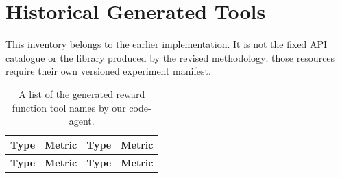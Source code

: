 \section{Historical Generated Tools} \label{apd:generated_tools}

This inventory belongs to the earlier implementation. It is not the fixed API catalogue or the library produced by the revised methodology; those resources require their own versioned experiment manifest.




% 



{\footnotesize\setlength{\tabcolsep}{3pt}%
\begin{longtable}{|l|l|l|l|}
\caption{A list of the generated reward function tool names by our code-agent.} \label{tab:tool_name_list} \\ \hline 
\textbf{Type} & \textbf{Metric} & \textbf{Type} & \textbf{Metric} \\
\hline
\endfirsthead

\hline
\textbf{Type} & \textbf{Metric} & \textbf{Type} & \textbf{Metric} \\
\hline
\endhead


\end{longtable}}
